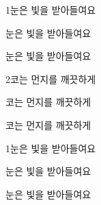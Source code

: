 \documentclass[fs13,seriesSau]{korfarm-base}
\begin{document}
\kfActivityBg \par{}
\par{}\par\nopagebreak[4]\smallskip\nopagebreak[4]
\begin{kfSentenceUnit}{1}{눈은 빛을 받아들여요}
\begin{kfChoices}
\kfChoice 눈은
\kfChoice 빛을
\kfChoice 받아들여요
\end{kfChoices}
\begin{kfChoices}
\kfChoice 눈은
\kfChoice 빛을
\kfChoice 받아들여요
\end{kfChoices}
\end{kfSentenceUnit}

\begin{kfSentenceUnit}{2}{코는 먼지를 깨끗하게}
\begin{kfChoices}
\kfChoice 코는
\kfChoice 먼지를
\kfChoice 깨끗하게
\end{kfChoices}
\begin{kfChoices}
\kfChoice 코는
\kfChoice 먼지를
\kfChoice 깨끗하게
\end{kfChoices}
\end{kfSentenceUnit}

\kfActivityBg \par{}
\par{}\par\nopagebreak[4]\smallskip\nopagebreak[4]
\begin{kfSentenceUnit}{1}{눈은 빛을 받아들여요}
\begin{kfChoices}
\kfChoice 눈은
\kfChoice 빛을
\kfChoice 받아들여요
\end{kfChoices}
\begin{kfChoices}
\kfChoice 눈은
\kfChoice 빛을
\kfChoice 받아들여요
\end{kfChoices}
\end{kfSentenceUnit}
\end{document}

